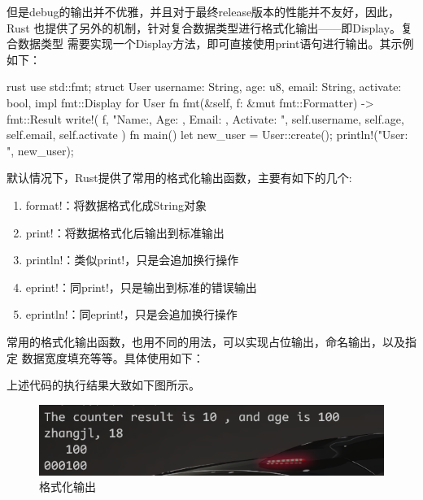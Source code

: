 但是debug的输出并不优雅，并且对于最终release版本的性能并不友好，因此，Rust
也提供了另外的机制，针对复合数据类型进行格式化输出——即Display。复合数据类型
需要实现一个Display方法，即可直接使用print语句进行输出。其示例如下：
\begin{code-block}{rust}
use std::fmt;
struct User {
    username: String,
    age: u8,
    email: String,
    activate: bool,
}
impl fmt::Display for User {
    fn fmt(&self, f: &mut fmt::Formatter) -> fmt::Result {
        write!(
            f,
            "Name:{}, Age: {}, Email: {}, Activate: {}",
            self.username, self.age, self.email, self.activate
        )
    }
}
fn main() {
    let new_user = User::create();
    println!("User: {}", new_user);
}
\end{code-block}

默认情况下，Rust提供了常用的格式化输出函数，主要有如下的几个:
\begin{enumerate}
  \item format!：将数据格式化成String对象
  \item print!：将数据格式化后输出到标准输出
  \item println!：类似print!，只是会追加换行操作
  \item eprint!：同print!，只是输出到标准的错误输出
  \item eprintln!：同eprint!，只是会追加换行操作
\end{enumerate}
常用的格式化输出函数，也用不同的用法，可以实现占位输出，命名输出，以及指定
数据宽度填充等等。具体使用如下：
上述代码的执行结果大致如下图所示。
\begin{figure}[H]
  \centering
  \includegraphics[scale=0.6]{rust_format.png}
  \caption{格式化输出}
  \label{fig:rust_format}
\end{figure}

